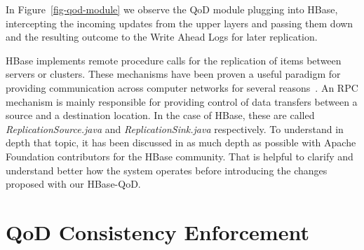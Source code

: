In Figure~\ref{fig-qod-module} we observe the QoD module plugging into HBase, intercepting the incoming updates from the upper layers and passing them down and the resulting outcome to the Write Ahead Logs for later replication.

HBase implements remote procedure calls for the replication of items between servers or clusters. These mechanisms have been proven a useful paradigm for providing communication across computer networks for several reasons~\cite{Birrell:1984}. An RPC mechanism is mainly responsible for providing control of data transfers between a source and a destination location. In the case of HBase, these are called \emph{ReplicationSource.java} and \emph{ReplicationSink.java} respectively. To understand in depth that topic, it has been discussed in as much depth as possible with Apache Foundation contributors for the HBase community. That is helpful to clarify and understand better how the system operates before introducing the changes proposed with our HBase-QoD.




\section{QoD Consistency Enforcement}\label{architecture:consistency}


